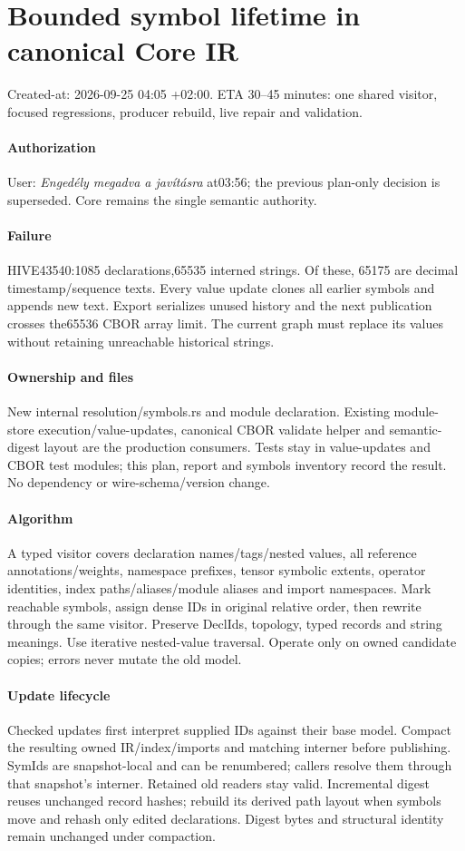 \documentclass{article}
\begin{document}
\section*{Bounded symbol lifetime in canonical Core IR}
Created-at: 2026-09-25 04:05 +02:00. ETA 30--45 minutes: one shared visitor,
focused regressions, producer rebuild, live repair and validation.
\paragraph{Authorization} User: \textit{Engedély megadva a javításra} at03:56; the previous
plan-only decision is superseded. Core remains the single semantic authority.
\paragraph{Failure} HIVE43540:1085 declarations,65535 interned strings. Of these,
65175 are decimal timestamp/sequence texts. Every value update clones all earlier
symbols and appends new text. Export serializes unused history and the next
publication crosses the65536 CBOR array limit. The current graph must replace
its values without retaining unreachable historical strings.
\paragraph{Ownership and files} New internal resolution/symbols.rs and module
declaration. Existing module-store execution/value-updates, canonical CBOR
validate helper and semantic-digest layout are the production consumers.
Tests stay in value-updates and CBOR test modules; this plan, report and symbols
inventory record the result. No dependency or wire-schema/version change.
\paragraph{Algorithm} A typed visitor covers declaration names/tags/nested values,
all reference annotations/weights, namespace prefixes, tensor symbolic extents,
operator identities, index paths/aliases/module aliases and import namespaces.
Mark reachable symbols, assign dense IDs in original relative order, then rewrite
through the same visitor. Preserve DeclIds, topology, typed records and string
meanings. Use iterative nested-value traversal. Operate only on owned candidate
copies; errors never mutate the old model.
\paragraph{Update lifecycle} Checked updates first interpret supplied IDs against
their base model. Compact the resulting owned IR/index/imports and matching
interner before publishing. SymIds are snapshot-local and can be renumbered;
callers resolve them through that snapshot's interner. Retained old readers stay
valid. Incremental digest reuses unchanged record hashes; rebuild its derived
path layout when symbols move and rehash only edited declarations. Digest bytes
and structural identity remain unchanged under compaction.
\end{document}
